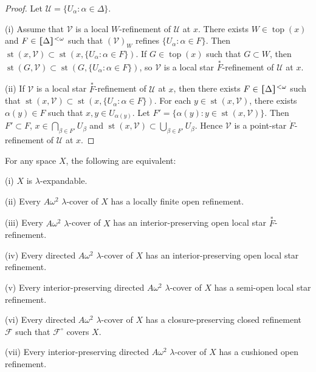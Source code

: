 \documentclass[jisng7iii.tex]{subfiles}
\begin{document}
\begin{proof}
Let $\mathscr{U}=\{U_\alpha: \alpha \in \Delta\}$.

(i)  Assume that $\mathscr{V}$ is a local $W$-refinement of 
$\mathscr{U}$ at $x$. There exists $W \in \operatorname{top}(x)$ and 
$F\in \hstretch{1.8}{[}\Delta\hstretch{1.8}{]}^{<\omega}$ such that $(\mathscr{V})_W$ refines $\{U_\alpha: \alpha \in F\}$. Then 
$\operatorname{st}(x, \mathscr{V}) \subset \operatorname{st}(x, \{U_\alpha: \alpha \in F\})$. 
If $G \in \operatorname{top}(x)$ such that $G \subset W$, then 
$\operatorname{st}(G, \mathscr{V}) \subset \operatorname{st}(G, \{U_\alpha: \alpha \in F\})$, 
 so $\mathscr{V}$ is a local star $\overset{*}{F}$-refinement of $\mathscr{U}$ at $x$.

(ii) If $\mathscr{V}$ is a local star $\overset{*}{F}$-refinement of $\mathscr{U}$ at $x$, 
then there exists $F\in \hstretch{1.8}{[}\Delta\hstretch{1.8}{]}^{<\omega}$ such that 
$\operatorname{st}(x, \mathscr{V}) \subset \operatorname{st}(x, \{U_\alpha: \alpha \in F\})$. 
For each 
$y \in \operatorname{st}(x, \mathscr{V})$, there exists $\alpha(y)\in F$ such that 
$x, y\in U_{\alpha(y)}$. Let $F' = \{\alpha(y): y \in \operatorname{st}(x, \mathscr{V})\}$. 
Then $F' \subset F$, $x \in \bigcap_{\beta\in F'} U_\beta$ and 
$\operatorname{st}(x, \mathscr{V})\subset \bigcup_{\beta\in F'}U_\beta$. 
Hence $\mathscr{V}$ is a point-star $\dot{F}$-refinement 
of $\mathscr{U}$ at $x$.
\end{proof}

{\theorem{} \label{th:7.2.3}
For any space $X$, the following are equivalent:

\textup{(i)} $X$ is $\lambda$-expandable.

\textup{(ii)}  Every $A\omega^2$ $\lambda$-cover of $X$ has a locally finite open refinement.

\textup{(iii)} Every $A\omega^2$ $\lambda$-cover of $X$ has an interior-preserving 
open local star $\overset{*}{F}$-refinement.


\textup{(iv)} Every directed $A\omega^2$ $\lambda$-cover of $X$ has 
an interior-preserving open local star refinement.


\textup{(v)}  Every interior-preserving directed $A\omega^2$ 
$\lambda$-cover of $X$ has a semi-open local star refinement.


\textup{(vi)}  Every directed $A\omega^2$ $\lambda$-cover of $X$ 
has a closure-preserving closed refinement $\mathscr{F}$ such that 
$\mathscr{F}^\circ$ covers $X$.


\textup{(vii)}  Every interior-preserving directed $A\omega^2$ 
$\lambda$-cover of $X$ has a cushioned open refinement.
}
\end{document}
